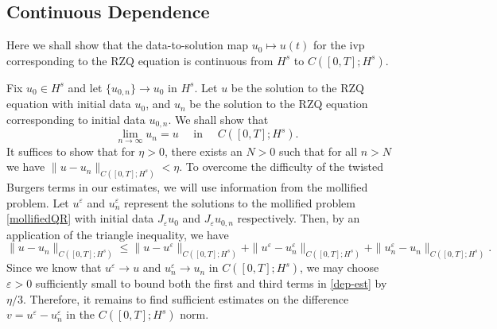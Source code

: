 \documentclass[reqno]{amsart}
\theoremstyle{plain}
\numberwithin{equation}{section}
\newcommand{\ee}{\varepsilon}
\begin{document}
\subsection{Continuous Dependence}
Here we shall show that the data-to-solution map $u_0 \mapsto u(t)$ for the ivp corresponding to the RZQ equation is continuous from $H^s$ to $C([0, T]; H^s)$. 

Fix $u_0 \in H^s$ and let $\{u_{0,n}\} \rightarrow u_0$ in $H^s$. Let $u$ be the solution to the RZQ equation with initial data $u_0$, and $u_n$ be the solution to the RZQ equation corresponding to initial data $u_{0,n}$. We shall show that 
$$
\lim_{n\rightarrow\infty} u_n = u \quad \text{ in } \quad C([0,T]; H^s). 
$$
It suffices to show that for $\eta >0$, there exists an $N>0$ such that for all $n>N$ we have $\|u-u_n\|_{C([0,T];H^s)}<\eta.$  To overcome the difficulty of the twisted Burgers terms in our estimates, we will use information from the mollified problem.  Let $u^\ee$ and $u_n^\ee$ represent the solutions to the mollified problem \eqref{mollifiedQR} with initial data $J_\ee u_0$ and $J_\ee u_{0,n}$ respectively.  Then, by an application of the triangle inequality, we have 
\begin{equation}\label{dep-est}
    \|u-u_n\|_{C([0,T];H^s)} \leq \|u-u^\ee\|_{C([0,T];H^s)} + \|u^\ee-u_n^\ee\|_{C([0,T];H^s)} + \|u_n^\ee-u_n\|_{C([0,T];H^s)}.
\end{equation}
Since we know that $u^\ee \to u$ and $u_n^\ee \to u_n$ in $C([0,T];H^s)$, we may choose $\ee>0$ sufficiently small to bound both the first and third terms in \eqref{dep-est} by $\eta/3$.  Therefore, it remains to find sufficient estimates on the difference $v=u^\ee-u_n^\ee$ in the $C([0,T];H^s)$ norm.
\end{document}
